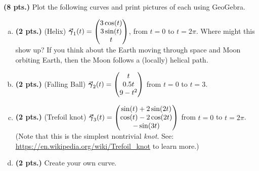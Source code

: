 \documentclass[12pt]{article} %
\begin{document}
\begin{problem}
\textbf{(8 pts.)} Plot the following curves and print pictures of each using GeoGebra.
\begin{enumerate}[(a)]
	\item \textbf{(2 pts.)} (Helix) $\boldsymbol{\vec{\gamma}}_1(t) = \begin{pmatrix} 3\cos(t) \\ 3\sin(t) \\ t\end{pmatrix}$, from $t=0$ to $t=2\pi$. Where might this show up? If you think about the Earth moving through space and Moon orbiting Earth, then the Moon follows a (locally) helical path.

	\item \textbf{(2 pts.)} (Falling Ball) $\boldsymbol{\vec{\gamma}}_2(t) = \begin{pmatrix} t\\  0.5t \\ 9-t^2 \end{pmatrix}$ from $t=0$ to $t=3$.

	\item \textbf{(2 pts.)} (Trefoil knot) $\boldsymbol{\vec{\gamma}}_3(t) = \begin{pmatrix} \sin(t)+2\sin(2t) \\ \cos(t)-2\cos(2t) \\ -\sin(3t) \end{pmatrix}$ from $t=0$ to $t=2\pi$. (Note that this is the simplest nontrivial \emph{knot}. See: \url{https://en.wikipedia.org/wiki/Trefoil_knot} to learn more.)

	\item \textbf{(2 pts.)} Create your own curve.
\end{enumerate}
\end{problem}
\end{document}
